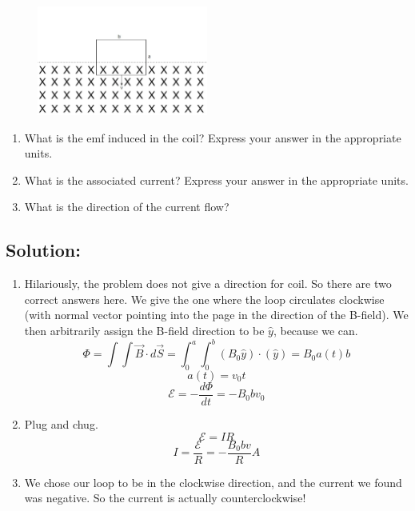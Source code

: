 \documentclass{article}
\begin{document}
\begin{figure}[H]
\begin{center}
    \includegraphics[width= 0.5\textwidth]{figures/square.jpg}
\end{center}
\end{figure}
\begin{enumerate}
    \item What is the emf induced in the coil? Express your answer in the appropriate units.
    \item What is the associated current? Express your answer in the appropriate units.
    \item What is the direction of the current flow?
\end{enumerate}
\subsection{Solution:} 
\begin{enumerate}
    \item Hilariously, the problem does not give a direction for coil. So there are two correct answers here. We give the one where the loop circulates clockwise (with normal vector pointing into the page in the direction of the B-field). We then arbitrarily assign the B-field direction to be $\hat{y}$, because we can.
    \begin{equation}
            \Phi = \int \int \Vec{B} \cdot d\Vec{S} = \int_{0}^{a} \int_{0}^{b} (B_0 \hat{y}) \cdot (\hat{y})=B_0 a(t)b \nonumber
          \end{equation}
          \begin{equation}
            a(t) = v_0 t\nonumber
          \end{equation}
          \begin{equation}
            \mathcal{E}=-\frac{d\Phi}{dt} = -B_0 b v_0 \nonumber
          \end{equation}
    \item Plug and chug.
    \begin{equation}
            \mathcal{E}=IR \nonumber
          \end{equation}
          \begin{equation}
            I=\frac{\mathcal{E}}{R} = -\frac{B_0 b v}{R}A \nonumber
          \end{equation}
    \item We chose our loop to be in the clockwise direction, and the current we found was negative. So the current is actually counterclockwise!
\end{enumerate}
\end{document}
